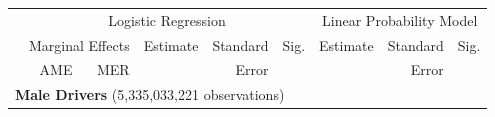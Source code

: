 
\begin{table}%
\centering 
\begin{tabular}{l r r r r l r r l} 

\hline 
 
 & \multicolumn{5}{c}{Logistic Regression}  & \multicolumn{3}{c}{Linear Probability Model} \\ 

 \cmidrule(lr){2-6}\cmidrule(lr){7-9} 
 & \multicolumn{2}{c}{Marginal Effects} & Estimate & Standard & Sig. & Estimate & Standard & Sig. \\ 
 &   AME & MER &          &  Error   &      &          &  Error   &     \\ 

\hline 
 
\multicolumn{7}{l}{\textbf{Male Drivers} (5,335,033,221 observations)} \\ 


\end{tabular}
\end{table}
